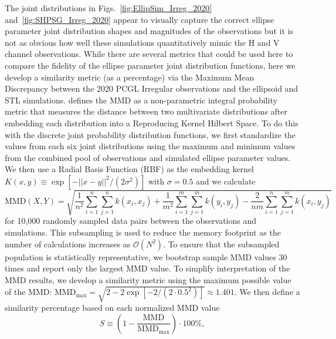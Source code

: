 \documentclass[amt, manuscript]{copernicus}
\begin{document}
 
The joint distributions in Figs.~\ref{fig:EllipSim_Irreg_2020} and~\ref{fig:SHPSG_Irreg_2020} appear to visually capture the correct ellipse parameter joint distribution shapes and magnitudes of the observations but it is not as obvious how well these simulations quantitatively mimic the H and V channel observations. While there are several metrics that could be used here to compare the fidelity of the ellipse parameter joint distribution functions, here we develop a similarity metric (as a percentage) via the Maximum Mean Discrepancy \citep[MMD; see][]{Gretton2012} between the 2020 PCGL Irregular observations and the ellipsoid and STL simulations. \citet{Gretton2012} defines the MMD as a non-parametric integral probability metric that measures the distance between two multivariate distributions after  embedding each distribution into a Reproducing Kernel Hilbert Space. To do this with the discrete joint probability distribution functions, we first standardize the values from each six joint distributions using the maximum and minimum values from the combined pool of observations and simulated ellipse parameter values. We then use a Radial Basis Function (RBF) as the embedding kernel $K(x,y) \equiv \exp\left[-||x-y||^{2}/(2\sigma^{2}) \right]$ with $\sigma=0.5$ and we calculate
\begin{equation}\label{eq:MMD}
\mathrm{MMD}(X, Y) = \sqrt{ \frac{1}{n^2} \sum_{i=1}^n \sum_{j=1}^n k(x_i, x_j) + \frac{1}{m^2} \sum_{i=1}^m \sum_{j=1}^m k(y_i, y_j) - \frac{2}{nm} \sum_{i=1}^n \sum_{j=1}^m k(x_i, y_j) }
\end{equation}
for 10,000 randomly sampled data pairs between the observations and simulations. This subsampling is used to reduce the memory footprint as the number of calculations increases as $\mathcal{O}(N^{2})$. To ensure that the  subsampled population is statistically representative, we bootstrap sample MMD values 30 times and report only the largest MMD value. To simplify interpretation of the MMD results, we develop a similarity metric using the maximum possible value of the MMD: $\mathrm{MMD}_{\max} = \sqrt{2 - 2 \exp\left[- 2/(2\cdot 0.5^{2})\right]} \approx 1.401$. We then define a similarity percentage based on each normalized MMD value
\begin{equation}
S \equiv \left(1 - \frac{\mathrm{MMD}}{\mathrm{MMD}_{\max}}\right) \cdot 100\%,
\end{equation}
\end{document}
